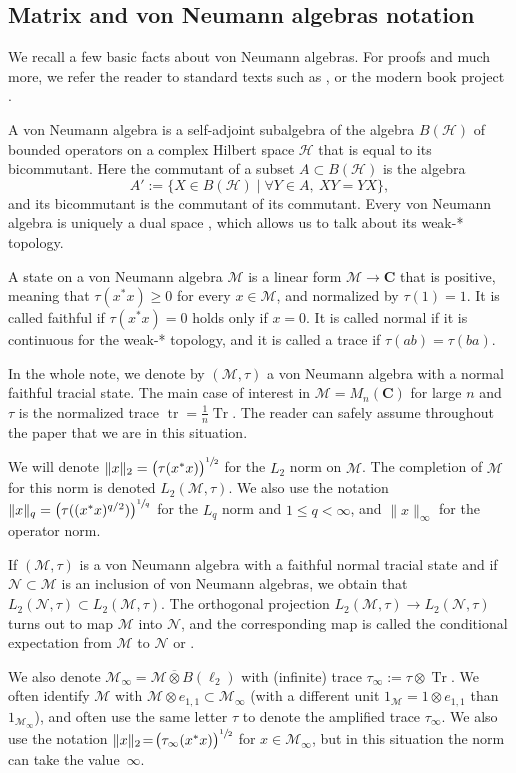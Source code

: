 \documentclass[10pt]{amsart}
\theoremstyle{plain}
\theoremstyle{definition}
\newcommand{\C}{\mathbf{C}}
\newcommand{\cM}{\mathcal{M}}
\newcommand{\cN}{\mathcal{N}}
\newcommand{\cH}{\mathcal{H}}
\DeclareMathOperator{\tr}{tr}
\DeclareMathOperator{\Tr}{Tr}
\begin{document}
\subsection{Matrix and von Neumann algebras notation}
We recall a few basic facts about von Neumann algebras. For proofs and much more, we refer the reader to standard texts such as \cite{MR1873025}, or the modern book project \cite{AnantharamanPopa}.

A von Neumann algebra is a self-adjoint subalgebra of the algebra $B(\cH)$ of bounded operators on a complex Hilbert space $\cH$ that is equal to its bicommutant. Here the commutant of a subset $A\subset B(\cH)$ is the algebra
\[
A':=\{X\in B(\cH)\mid \forall Y \in A,\ XY=YX\},
\] and its bicommutant is the commutant of its commutant. Every von Neumann algebra is uniquely a dual space \cite[Cor.\,III.3.9]{MR1873025}, which allows us to talk about its weak-* topology.

A state on a von Neumann algebra $\cM$ is a linear form $\cM \to \C$ that is positive, meaning that $\tau(x^*x)\geq 0$ for every $x\in \cM$, and normalized by $\tau(1)=1$. It is called faithful if $\tau(x^*x)=0$ holds only if $x=0$. It is called normal if it is continuous for the weak-* topology, and it is called a trace if $\tau(ab)=\tau(ba)$.

In the whole note, we denote by $(\cM,\tau)$ a von Neumann algebra with a normal faithful tracial state. The main case of interest in $\cM = M_n(\C)$ for large $n$ and $\tau$ is the normalized trace $\tr = \frac{1}{n}\Tr$. The reader can safely assume throughout the paper that we are in this situation.

We will denote $\|x\|_2 = \big(\tau(x^*x)\big)^{\sfrac 1 2}$ for the $L_2$ norm on $\cM$. The completion of $\cM$ for this norm is denoted $L_2(\cM,\tau)$. We also use the notation $\|x\|_q = \big(\tau( (x^*x)^{q/2})\big)^{\sfrac 1 q}$ for the $L_q$ norm and $1\leq q<\infty$, and $\|x\|_\infty$ for the operator norm.

If $(\cM,\tau)$ is a von Neumann algebra with a faithful normal tracial state and if $\cN \subset\cM$ is an inclusion of von Neumann algebras, we obtain that $L_2(\cN,\tau)\subset L_2(\cM,\tau)$. The orthogonal projection $L_2(\cM,\tau) \to L_2(\cN,\tau)$ turns out to map $\cM$ into $\cN$, and the corresponding map is called the conditional expectation from $\cM$ to $\cN$ \cite[\S 9]{AnantharamanPopa} or \cite[Prop.\,V.2.36]{MR1873025}.

We also denote $\cM_\infty = \cM \overline{\otimes} B(\ell_2)$ with (infinite) trace $\tau_\infty:=\tau \otimes \Tr$. We often identify $\cM$ with $\cM \otimes e_{1,1} \subset \cM_\infty$ (with a different unit $1_\cM = 1 \otimes e_{1,1}$ than $1_{\cM_\infty}$), and often use the same letter $\tau$ to denote the amplified trace $\tau_\infty$. We also use the notation $\|x\|_2 \!=\! \big(\tau_\infty(x^*x)\big)^{\sfrac 1 2}$ for $x \!\in\! \cM_\infty$, but in this situation the norm can take the value~$\infty$.
\end{document}
